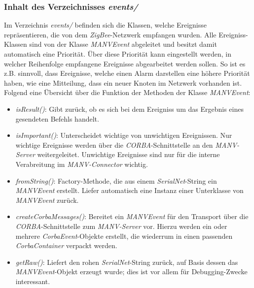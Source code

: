     \subsubsection{Inhalt des Verzeichnisses \emph{events/}}
    
    Im Verzeichnis \emph{events/} befinden sich die Klassen, welche Ereignisse repräsentieren, die von dem 
    \emph{ZigBee}-Netzwerk empfangen wurden. Alle Ereigniss-Klassen sind von der Klasse \emph{MANVEvent} abgeleitet 
    und besitzt damit automatisch eine Priorität. Über diese Priorität kann eingestellt werden, in welcher Reihenfolge 
    empfangene Ereignisse abgearbeitet werden sollen. So ist es z.B. sinnvoll, dass Ereignisse, welche einen Alarm 
    darstellen eine höhere Priorität haben, wie eine Mitteilung, dass ein neuer Knoten im Netzwerk vorhanden ist. 
    Folgend eine Übersicht über die Funktion der Methoden der Klasse \emph{MANVEvent}:

    \begin{itemize}
            \item{\emph{isResult()}:} Gibt zurück, ob es sich bei dem Ereigniss um das Ergebnis eines gesendeten Befehls handelt. 
            \item{\emph{isImportant()}:} Unterscheidet wichtige von unwichtigen Ereignissen. Nur wichtige Ereignisse werden über 
                                  die \emph{CORBA}-Schnittstelle an den \emph{MANV-Server} weitergeleitet. Unwichtige 
                                  Ereignisse sind nur für die interne Verabreitung im \emph{MANV-Connector} wichtig. 
            \item{\emph{fromString()}:}  Factory-Methode, die aus einem \emph{SerialNet}-String ein \emph{MANVEvent} erstellt. 
                                  Liefer automatisch eine Instanz einer Unterklasse von \emph{MANVEvent} zurück.
            \item{\emph{createCorbaMessages()}:} Bereitet ein \emph{MANVEvent} für den Transport über die 
                                          \emph{CORBA}-Schnittstelle zum \emph{MANV-Server} vor. Hierzu werden ein oder 
                                          mehrere \emph{CorbaEvent}-Objekte erstellt, die wiederrum in einen
                                          passenden \emph{CorbaContainer} verpackt werden.
            \item{\emph{getRaw()}:} Liefert den rohen \emph{SerialNet}-String zurück, auf Basis dessen das \emph{MANVEvent}-Objekt 
                             erzeugt wurde; dies ist vor allem für Debugging-Zwecke interessant.
    \end{itemize}

